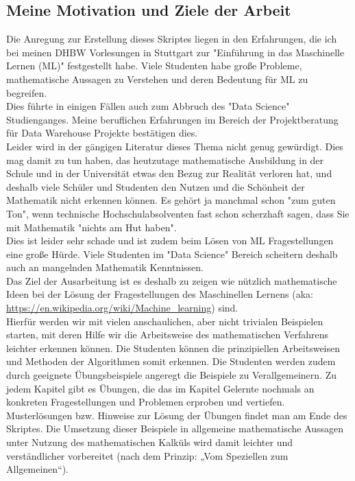 \documentclass[12pt]{article}
\begin{document}
\subsection{Meine Motivation und Ziele der Arbeit}
Die Anregung zur Erstellung dieses Skriptes liegen in den Erfahrungen, die ich bei meinen DHBW Vorlesungen in Stuttgart zur "Einführung in das Maschinelle Lernen (ML)" festgestellt habe. Viele Studenten habe große Probleme, mathematische Aussagen zu Verstehen und deren Bedeutung für ML zu begreifen.
\\
Dies führte in einigen Fällen auch zum Abbruch des "Data Science" Studienganges. Meine beruflichen Erfahrungen im Bereich der Projektberatung für Data Warehouse Projekte bestätigen dies.\\
Leider wird in der gängigen Literatur dieses Thema nicht genug gewürdigt. Dies mag damit zu tun haben, das heutzutage mathematische Ausbildung in der Schule und in der Universität etwas den Bezug zur Realität verloren hat, und deshalb viele Schüler und Studenten den Nutzen und die Schönheit der Mathematik nicht erkennen können. Es gehört ja manchmal schon "zum guten Ton", wenn technische Hochschulabsolventen fast schon scherzhaft sagen, dass Sie mit Mathematik "nichts am Hut haben".\\
Dies ist leider sehr schade und ist zudem beim Lösen von ML Fragestellungen eine große Hürde. Viele Studenten im "Data Science" Bereich scheitern deshalb auch an mangelnden Mathematik Kenntnissen.\\[0.2cm]
%
Das Ziel der Ausarbeitung ist es deshalb zu zeigen wie nützlich mathematische Ideen bei der Lösung der Fragestellungen des Maschinellen Lernens (aka: \url{https://en.wikipedia.org/wiki/Machine_learning}) sind.\\
Hierfür werden wir mit vielen anschaulichen, aber nicht trivialen Beispielen starten, mit deren Hilfe wir die Arbeitsweise des mathematischen Verfahrens leichter erkennen können. Die Studenten können die prinzipiellen Arbeitsweisen und Methoden der Algorithmen somit erkennen. Die Studenten werden zudem durch geeignete Übungsbeispiele angeregt die Beispiele zu Verallgemeinern. Zu jedem Kapitel gibt es Übungen, die das im Kapitel Gelernte nochmals an konkreten Fragestellungen und Problemen erproben und vertiefen. \\
Musterlösungen bzw. Hinweise zur Lösung der Übungen findet man am Ende des Skriptes. Die Umsetzung dieser Beispiele in allgemeine mathematische Aussagen unter Nutzung des mathematischen Kalküls wird damit leichter und verständlicher vorbereitet (nach dem Prinzip: „Vom Speziellen zum Allgemeinen“). \\[0.2cm]\\
\end{document}
